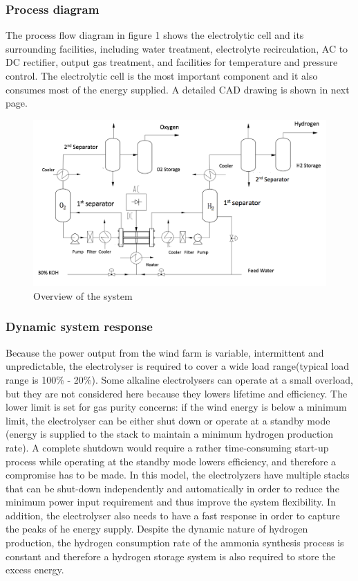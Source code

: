 \subsubsection{Process diagram} 
The process flow diagram in figure 1 shows the electrolytic cell and its surrounding facilities, including water treatment, electrolyte recirculation, AC to DC rectifier, output gas treatment, and facilities for temperature and pressure control. The electrolytic cell is the most important component and it also consumes most of the energy supplied. A detailed CAD drawing is shown in next page.

\begin{figure}[H]
\centering
\includegraphics[width= 9 cm] {overview.png} 
\caption{Overview of the system} 
\end{figure}  



\subsubsection{Dynamic system response}
Because the power output from the wind farm is variable, intermittent and unpredictable, the electrolyser is required to cover a wide load range(typical load range is 100\% - 20\%). Some alkaline electrolysers can operate at a small overload, but they are not considered here because they lowers lifetime and efficiency. The lower limit is set for gas purity concerns: if the wind energy is below a minimum limit, the electrolyser can be either shut down or operate at a standby mode (energy is supplied to the stack to maintain a minimum hydrogen production rate). A complete shutdown would require a rather time-consuming start-up process while operating at the standby mode lowers efficiency, and therefore a compromise has to be made. In this model, the electrolyzers have multiple stacks that can be shut-down independently and automatically in order to reduce the minimum power input requirement and thus improve the system flexibility.  In addition, the electrolyser also needs to have a fast response in order to capture the peaks of he energy supply. Despite the dynamic nature of hydrogen production, the hydrogen consumption rate of the ammonia synthesis process is constant and therefore a hydrogen storage system is also required to store the excess energy. \cite{purity}\cite{gas} 
